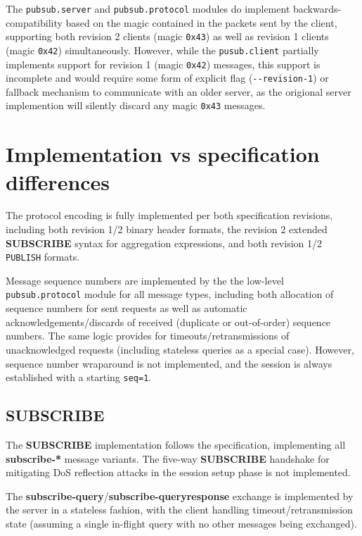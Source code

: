 \documentclass[a4paper]{article}
\begin{document}
The \texttt{pubsub.server} and \texttt{pubsub.protocol} modules do implement backwards-compatibility based on the magic contained in the packets sent by the client, supporting both revision 2 clients (magic \texttt{0x43}) as well as revision 1 clients (magic \texttt{0x42}) simultaneously.
However, while the \texttt{pusub.client} partially implements support for revision 1 (magic \texttt{0x42}) messages, this support is incomplete and would require some form of explicit flag (\texttt{\--\--revision-1}) or fallback mechanism to communicate with an older server, as the origional server implemention will silently discard any magic \texttt{0x43} messages.

\section{Implementation vs specification differences}

The protocol encoding is fully implemented per both specification revisions, including both revision 1/2 binary header formats, the revision 2 extended \textbf{SUBSCRIBE} syntax for aggregation expressions, and both revision 1/2 \texttt{PUBLISH} formats.

Message sequence numbers are implemented by the the low-level \texttt{pubsub.protocol} module for all message types, including both allocation of sequence numbers for sent requests as well as automatic acknowledgements/discards of received (duplicate or out-of-order) sequence numbers.
The same logic provides for timeouts/retransmissions of unacknowledged requests (including stateless queries as a special case).
However, sequence number wraparound is not implemented, and the session is always established with a starting \texttt{seq=1}.

\subsection{\textbf{SUBSCRIBE}}
The \textbf{SUBSCRIBE} implementation follows the specification, implementing all \textbf{subscribe-*} message variants.
The five-way \textbf{SUBSCRIBE} handshake for mitigating DoS reflection attacks in the session setup phase is not implemented.

The \textbf{subscribe-query}/\textbf{subscribe-queryresponse} exchange is implemented by the server in a stateless fashion, with the client handling timeout/retransmission state (assuming a single in-flight query with no other messages being exchanged).
\end{document}
